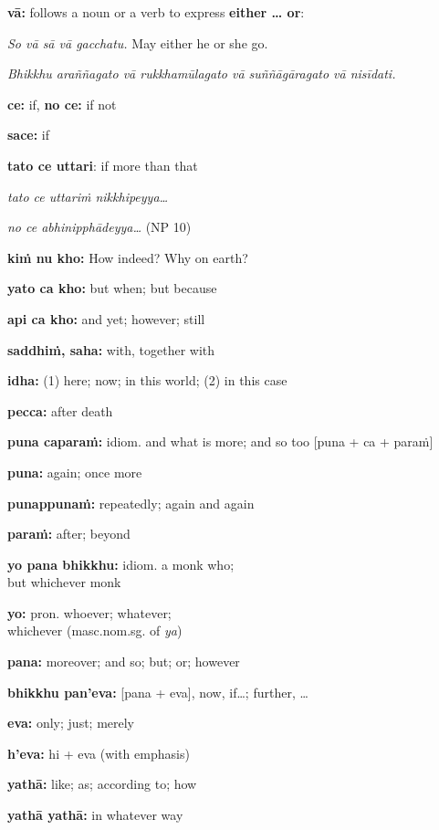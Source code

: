 \documentclass[11pt,oneside]{memoir}
\begin{document}
\begin{multicols}{2}

\textbf{vā:} follows a noun or a verb to express \textbf{either \ldots{} or}:

\emph{So vā sā vā gacchatu.} May either he or she go.

\emph{Bhikkhu araññagato vā rukkhamūlagato vā suññāgāragato vā nisīdati.}

\textbf{ce:} if, \textbf{no ce:} if not

\textbf{sace:} if

\textbf{tato ce uttari}: if more than that

\emph{tato ce uttariṁ nikkhipeyya\ldots{}}

\emph{no ce abhinipphādeyya\ldots{}} (NP 10)

\textbf{kiṁ nu kho:} How indeed? Why on earth?

\textbf{yato ca kho:} but when; but because

\textbf{api ca kho:} and yet; however; still

\textbf{saddhiṁ, saha:} with, together with

\textbf{idha:} (1) here; now; in this world; (2) in this case

\textbf{pecca:} after death

\columnbreak

\textbf{puna caparaṁ:} idiom. and what is more; and so too [puna + ca + paraṁ]

\textbf{puna:} again; once more

\textbf{punappunaṁ:} repeatedly; again and again

\textbf{paraṁ:} after; beyond

\textbf{yo pana bhikkhu:} idiom. a monk who;\\[0pt]
but whichever monk

\textbf{yo:} pron. whoever; whatever;\\[0pt]
whichever (masc.nom.sg. of \emph{ya})

\textbf{pana:} moreover; and so; but; or; however

\textbf{bhikkhu pan'eva:} [pana + eva], now, if\ldots{}; further, \ldots{}

\textbf{eva:} only; just; merely

\textbf{h'eva:} hi + eva (with emphasis)

\textbf{yathā:} like; as; according to; how

\textbf{yathā yathā:} in whatever way

\end{multicols}
\end{document}

